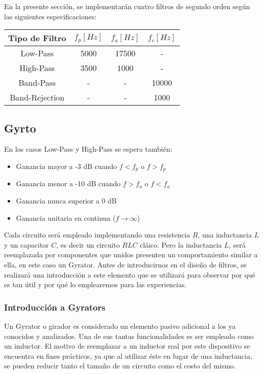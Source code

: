 En la presente sección, se implementarán cuatro filtros de segundo orden según las siguientes especificaciones:

\begin{table}[H]
    \centering
    \begin{tabular}{|c|c|c|c|}
    \hline
    \rowcolor[HTML]{C0C0C0} 
    Tipo de Filtro & $f_p[Hz]$ & $f_a[Hz]$ & $f_c[Hz]$ \\ \hline
    Low-Pass       & 5000   & 17500  & -      \\ \hline
    High-Pass      & 3500   & 1000   & -      \\ \hline
    Band-Pass      & -      & -      & 10000  \\ \hline
    Band-Rejection & -      & -      & 1000   \\ \hline
    \end{tabular}
    \end{table}


\subsection{Gyrto}


En los casos Low-Pass y High-Pass se espera también:

\begin{itemize}
	\item Ganancia mayor a -3 dB cuando $f < f_p$ o $f > f_p$ 
	\item Ganancia menor a -10 dB cuando $f > f_a$ o $f < f_a$
	\item Ganancia nunca superior a 0 dB
	\item Ganancia unitaria en continua ($f \to \infty$)
\end{itemize}

Cada circuito será empleado implementando una resistencia $R$, una inductancia $L$ y un capacitor $C$, es decir un circuito $RLC$
cláico. Pero la inductancia $L$, será reemplazada por componentes que unidos presenten un comportamiento similar a ella, en este caso
un Gyrator. Antes de introducirnos en el diseño de filtros, se realizará una introducción a este elemento que se utilizará para observar
por qué es tan útil y por qué lo emplearemos para las experiencias.

\subsubsection{Introducción a Gyrators}

Un Gyrator o girador es considerado un elemento pasivo adicional a los ya conocidos y analizados. Una de sus tantas funcionalidades es ser empleado como un inductor. 
El motivo de reemplazar a un inductor real por este dispositivo se encuentra en fines prácticos, ya que al utilizar éste en lugar de una inductancia, se pueden reducir 
tanto el tamaño de un circuito como el costo del mismo. 

